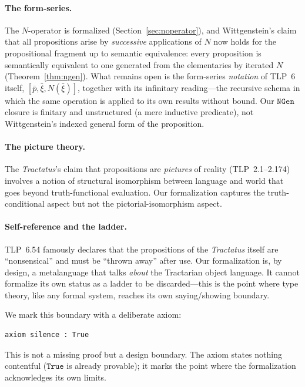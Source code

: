 \documentclass[jsl,bibother]{asl}
\theoremstyle{definition}
\theoremstyle{remark}
\begin{document}
\paragraph{The form-series.}
The $N$-operator is formalized
(Section~\ref{sec:noperator}), and Wittgenstein's claim that
all propositions arise by \emph{successive} applications of
$N$ now holds for the propositional fragment up to semantic
equivalence: every proposition is semantically equivalent to
one generated from the elementaries by iterated $N$
(Theorem~\ref{thm:ngen}).  What remains open is the
form-series \emph{notation} of TLP~6 itself,
$[\bar{p}, \bar{\xi}, N(\bar{\xi})]$, together with its
infinitary reading---the recursive schema in which the same
operation is applied to its own results without bound.  Our
$\mathtt{NGen}$ closure is finitary and unstructured (a mere
inductive predicate), not Wittgenstein's indexed general form
of the proposition.

\paragraph{The picture theory.}
The \emph{Tractatus}'s claim that propositions are
\emph{pictures} of reality (TLP~2.1--2.174) involves a notion
of structural isomorphism between language and world that goes
beyond truth-functional evaluation.  Our formalization captures
the truth-conditional aspect but not the pictorial-isomorphism
aspect.

\paragraph{Self-reference and the ladder.}
\label{sec:ladder}
TLP~6.54 famously declares that the propositions of the
\emph{Tractatus} itself are ``nonsensical'' and must be ``thrown
away'' after use.  Our formalization is, by design, a
metalanguage that talks \emph{about} the Tractarian object
language.  It cannot formalize its own status as a ladder to be
discarded---this is the point where type theory, like any formal
system, reaches its own saying/showing boundary.

We mark this boundary with a deliberate axiom:

\begin{lstlisting}
axiom silence : True
\end{lstlisting}

\noindent
This is not a missing proof but a design boundary.  The axiom
states nothing contentful ($\mathtt{True}$ is already provable);
it marks the point where the formalization acknowledges its own
limits.
\end{document}
